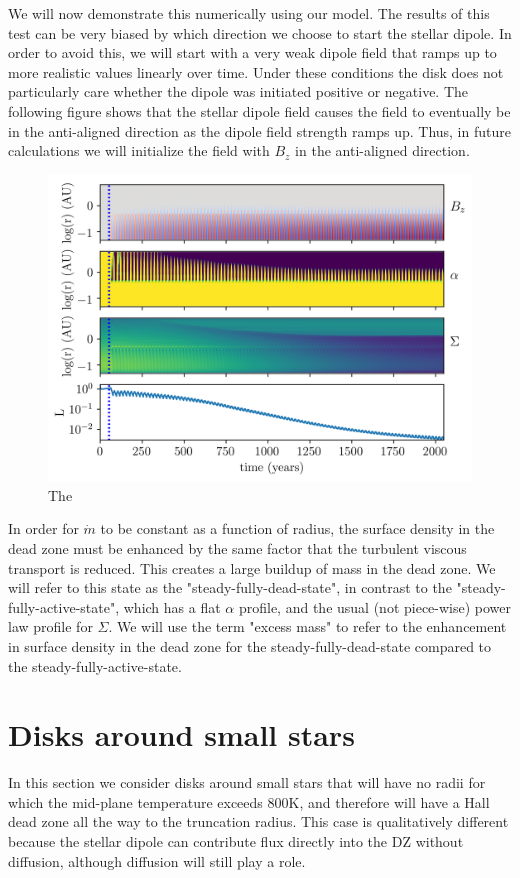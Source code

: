 We will now demonstrate this numerically using our model.  The results of this test can be very biased by which direction we choose to start the stellar dipole.  In order to avoid this, we will start with a very weak dipole field that ramps up to more realistic values linearly over time.  Under these conditions the disk does not particularly care whether the dipole was initiated positive or negative.  The following figure shows that the stellar dipole field causes the field to eventually be in the anti-aligned direction as the dipole field strength ramps up.  Thus, in future calculations we will initialize the field with $B_z$ in the anti-aligned direction.    

\begin{figure}[p]
\centering
\includegraphics[width=0.7\columnwidth]{figs/figsChapter3/run3077/MST1.png}
\caption{The}
\label{fiStExample}
\end{figure}

 In order for $\dot{m}$ to be constant as a function of radius, the surface density in the dead zone must be enhanced by the same factor that the turbulent viscous transport is reduced.  This creates a large buildup of mass in the dead zone.  We will refer to this state as the "steady-fully-dead-state", in contrast to the "steady-fully-active-state", which has a flat $\alpha$ profile, and the usual (not piece-wise) power law profile for $\Sigma$.  We will use the term "excess mass" to refer to the enhancement in surface density in the dead zone for the steady-fully-dead-state compared to the steady-fully-active-state.   




\newpage
\section{Disks around small stars}
In this section we consider disks around small stars that will have no radii for which the mid-plane temperature exceeds 800K, and therefore will have a Hall dead zone all the way to the truncation radius.  This case is qualitatively different because the stellar dipole can contribute flux directly into the DZ without diffusion, although diffusion will still play a role.  

